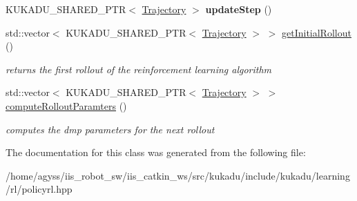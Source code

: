 \begin{DoxyCompactItemize}
\item 
K\+U\+K\+A\+D\+U\+\_\+\+S\+H\+A\+R\+E\+D\+\_\+\+P\+TR$<$ \hyperlink{classkukadu_1_1Trajectory}{Trajectory} $>$ {\bfseries update\+Step} ()\hypertarget{classkukadu_1_1PoWER_a1742695dab4e560cf0256b1a26555990}{}\label{classkukadu_1_1PoWER_a1742695dab4e560cf0256b1a26555990}

\item 
std\+::vector$<$ K\+U\+K\+A\+D\+U\+\_\+\+S\+H\+A\+R\+E\+D\+\_\+\+P\+TR$<$ \hyperlink{classkukadu_1_1Trajectory}{Trajectory} $>$ $>$ \hyperlink{classkukadu_1_1PoWER_a944ac3c9811932c00eb085481baa53f8}{get\+Initial\+Rollout} ()\hypertarget{classkukadu_1_1PoWER_a944ac3c9811932c00eb085481baa53f8}{}\label{classkukadu_1_1PoWER_a944ac3c9811932c00eb085481baa53f8}

\begin{DoxyCompactList}\small\item\em returns the first rollout of the reinforcement learning algorithm \end{DoxyCompactList}\item 
std\+::vector$<$ K\+U\+K\+A\+D\+U\+\_\+\+S\+H\+A\+R\+E\+D\+\_\+\+P\+TR$<$ \hyperlink{classkukadu_1_1Trajectory}{Trajectory} $>$ $>$ \hyperlink{classkukadu_1_1PoWER_aae0e23c81c88faa2bbd49f4f9a99dd28}{compute\+Rollout\+Paramters} ()\hypertarget{classkukadu_1_1PoWER_aae0e23c81c88faa2bbd49f4f9a99dd28}{}\label{classkukadu_1_1PoWER_aae0e23c81c88faa2bbd49f4f9a99dd28}

\begin{DoxyCompactList}\small\item\em computes the dmp parameters for the next rollout \end{DoxyCompactList}\end{DoxyCompactItemize}


The documentation for this class was generated from the following file\+:\begin{DoxyCompactItemize}
\item 
/home/agyss/iis\+\_\+robot\+\_\+sw/iis\+\_\+catkin\+\_\+ws/src/kukadu/include/kukadu/learning/rl/policyrl.\+hpp\end{DoxyCompactItemize}
